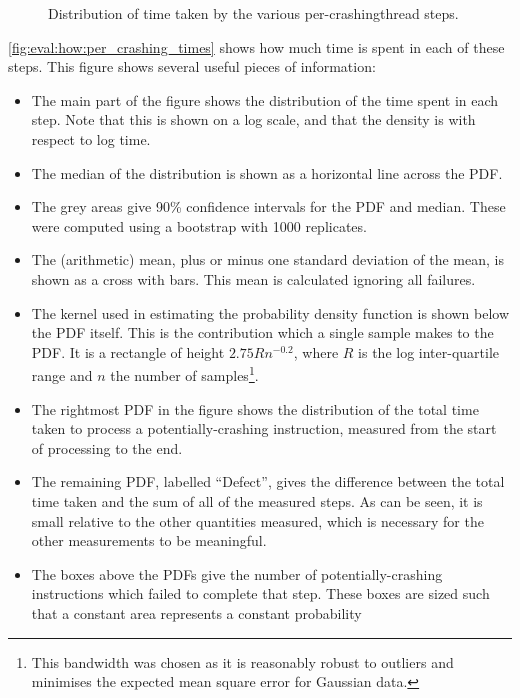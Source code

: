\begin{figure}
  \centerline{
  }
  \caption{Distribution of time taken by the various
    per-\gls{crashingthread} steps. \label{fig:eval:how:per_crashing_times}}
\end{figure}

\autoref{fig:eval:how:per_crashing_times} shows how much time is spent
in each of these steps.  This figure shows several useful pieces of
information:
\begin{itemize}
\item The main part of the figure shows the distribution of the time
  spent in each step.  Note that this is shown on a log scale, and
  that the density is with respect to log time.
\item The median of the distribution is shown as a horizontal line
  across the PDF.
\item The grey areas give 90\% confidence intervals for the PDF and
  median.  These were computed using a bootstrap with 1000 replicates.
\item The (arithmetic) mean, plus or minus one standard deviation of
  the mean, is shown as a cross with bars.  This mean is calculated
  ignoring all failures.  
\item The kernel used in estimating the probability density function
  is shown below the PDF itself.  This is the contribution which a
  single sample makes to the PDF.  It is a rectangle of height
  $2.75Rn^{-0.2}$, where $R$ is the log inter-quartile range and $n$
  the number of samples\footnote{This bandwidth was chosen as it is
    reasonably robust to outliers and minimises the expected mean
    square error for Gaussian data.}.
\item The rightmost PDF in the figure shows the distribution of the
  total time taken to process a potentially-crashing instruction,
  measured from the start of processing to the end.
\item The remaining PDF, labelled ``Defect'', gives the difference
  between the total time taken and the sum of all of the measured
  steps.  As can be seen, it is small relative to the other quantities
  measured, which is necessary for the other measurements to be
  meaningful.
\item The boxes above the PDFs give the number of potentially-crashing
  instructions which failed to complete that step.  These boxes are
  sized such that a constant area represents a constant probability

\end{itemize}
